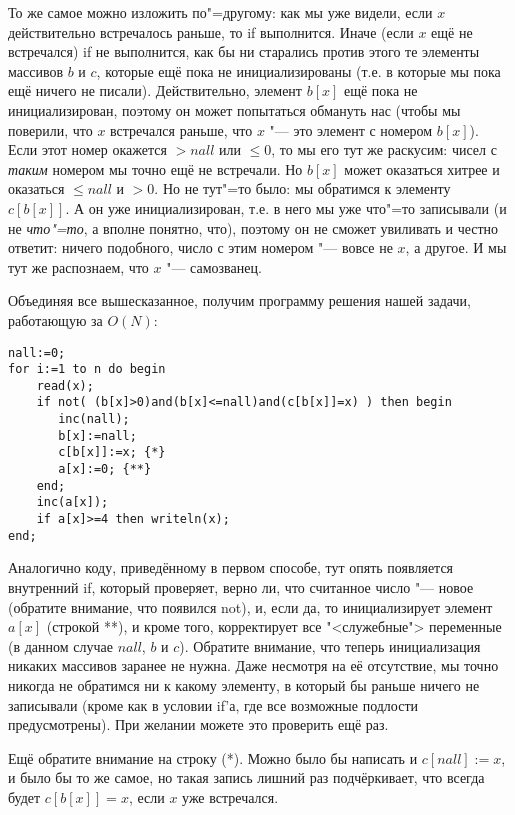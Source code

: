 То же самое можно изложить по"=другому: как мы уже видели, если $x$ действительно встречалось 
раньше, то if выполнится. Иначе (если $x$ ещё не встречался) if не выполнится, как бы ни старались против этого те элементы 
массивов $b$ и $c$, которые ещё пока не инициализированы (т.е. в которые мы пока ещё ничего не 
писали). Действительно, элемент $b[x]$ ещё пока не инициализирован, поэтому он может попытаться 
обмануть нас (чтобы мы поверили, что $x$ встречался раньше, что $x$ "--- это элемент с номером $b[x]$).  
Если этот номер окажется $>nall$ или $\leq 0$, то мы его тут же раскусим: чисел с \textit{таким} номером мы 
точно ещё не встречали. Но $b[x]$ может оказаться хитрее и оказаться $\leq nall$ и $>0$. Но не тут"=то 
было: мы обратимся к элементу $c[b[x]]$. А он уже инициализирован, т.е. в него мы уже что"=то 
записывали (и не \textit{что"=то}, а вполне понятно, что), поэтому он не сможет увиливать и честно 
ответит: ничего подобного, число с этим номером "--- вовсе не $x$, а другое. И мы тут же 
распознаем, что $x$ "--- самозванец.

Объединяя все вышесказанное, получим программу решения нашей задачи, работающую за 
$O(N)$:
\begin{codesampleo}\begin{verbatim}
nall:=0;
for i:=1 to n do begin
    read(x);
    if not( (b[x]>0)and(b[x]<=nall)and(c[b[x]]=x) ) then begin
       inc(nall);
       b[x]:=nall;
       c[b[x]]:=x; {*}
       a[x]:=0; {**}
    end;
    inc(a[x]);
    if a[x]>=4 then writeln(x);
end;
\end{verbatim}
\end{codesampleo}

Аналогично коду, приведённому в первом способе, тут опять появляется внутренний if, который 
проверяет, верно ли, что считанное число "--- новое (обратите внимание, что появился not), и, если 
да, то инициализирует элемент $a[x]$ (строкой **), и кроме того, корректирует все 
"<служебные"> переменные (в данном случае $nall$, $b$ и $c$). Обратите внимание, что теперь 
инициализация никаких массивов заранее не нужна. Даже несмотря на её отсутствие, мы точно никогда 
не обратимся ни к какому элементу, в который бы раньше ничего не записывали (кроме как в условии 
if'а, где все возможные подлости предусмотрены). При желании можете это проверить ещё раз.

Ещё обратите внимание на строку (*). Можно было бы написать и $c[nall]:=x$, и было бы то же самое, 
но такая запись лишний раз подчёркивает, что всегда будет $c[b[x]]=x$, если $x$ уже встречался.

